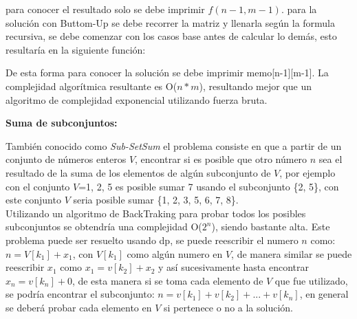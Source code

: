 \documentclass[12pt, a4paper]{article}
\newcommand\cppfile[2][]{

}
\newcommand{\subtitulo}[1]{\begin{center}\textbf{#1}\end{center}}
\begin{document}
	para conocer el resultado solo se debe imprimir $f(n-1, m-1)$. para la solución con Buttom-Up se debe recorrer 
	la matriz y llenarla según la formula recursiva, se debe comenzar con los casos base antes de calcular lo demás, 
	esto resultaría en la siguiente función:
	\cppfile[22-35]{codigos/matriz.cpp}
	De esta forma para conocer la solución se debe imprimir memo[n-1][m-1]. La complejidad algorítmica resultante
	es O($n*m$), resultando mejor que un algoritmo de complejidad exponencial utilizando fuerza bruta.\\
	
	\subtitulo{Suma de subconjuntos:}
	
	También conocido como \textit{Sub-SetSum} el problema consiste en que a partir de un conjunto de números enteros
	$V$, encontrar si es posible que otro número $n$ sea el resultado de la suma de los elementos de algún
	subconjunto de $V$, por ejemplo con el conjunto $V$={1, 2, 5} es posible sumar 7 usando el subconjunto \{2, 5\},
	con este conjunto $V$ seria posible sumar \{1, 2, 3, 5, 6, 7, 8\}.\\
	
	Utilizando un algoritmo de BackTraking para probar todos los posibles subconjuntos se obtendría una complejidad
	O($2^{n}$), siendo bastante alta. Este problema puede ser resuelto usando dp, se puede reescribir el numero $n$
	como: $n=V[k_{1}]+x_{1}$, con $V[k_{1}]$ como algún numero en $V$, de manera similar se puede reescribir $x_{1}$
	como $x_{1}=v[k_{2}]+x_{2}$ y así sucesivamente hasta encontrar $x_{n}=v[k_{n}]+0$, de esta manera si se toma 
	cada elemento de $V$ que fue utilizado, se podría encontrar el subconjunto: $n=v[k_{1}]+v[k_{2}]+...+v[k_{n}]$,
	en general se deberá probar cada elemento en $V$ si pertenece o no a la solución.\\
	
\end{document}
